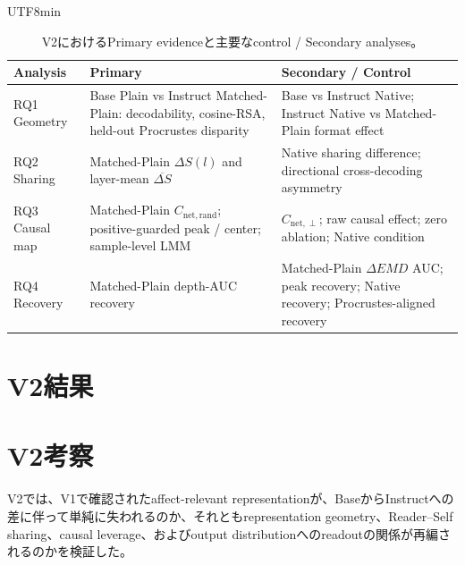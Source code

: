 \documentclass{article} %
\begin{document}
\begin{CJK*}{UTF8}{min}
\begin{table}[htbp]
\centering
\small
\caption{V2におけるPrimary evidenceと主要なcontrol / Secondary analyses。}
\label{tab:v2-primary-secondary}
\begin{tabularx}{\linewidth}{
@{}
>{\raggedright\arraybackslash}p{2.1cm}
>{\raggedright\arraybackslash}p{4.1cm}
>{\raggedright\arraybackslash}X
@{}
}
\toprule
\textbf{Analysis} &
\textbf{Primary} &
\textbf{Secondary / Control} \\
\midrule
RQ1 Geometry &
Base Plain vs Instruct Matched-Plain:
decodability,
cosine-RSA,
held-out Procrustes disparity &
Base vs Instruct Native;
Instruct Native vs Matched-Plain format effect \\

RQ2 Sharing &
Matched-Plain
\(\Delta S(l)\) and layer-mean
\(\overline{\Delta S}\) &
Native sharing difference;
directional cross-decoding asymmetry \\

RQ3 Causal map &
Matched-Plain
\(C_{\mathrm{net,rand}}\);
positive-guarded peak / center;
sample-level LMM &
\(C_{\mathrm{net,\perp}}\);
raw causal effect;
zero ablation;
Native condition \\

RQ4 Recovery &
Matched-Plain
depth-AUC recovery &
Matched-Plain \(\Delta EMD\) AUC;
peak recovery;
Native recovery;
Procrustes-aligned recovery \\
\bottomrule
\end{tabularx}
\end{table}



\section{V2結果}
\label{sec:v2-results}




\section{V2考察}
\label{sec:v2-discussion}

V2では、V1で確認されたaffect-relevant representationが、BaseからInstructへの差に伴って単純に失われるのか、それともrepresentation geometry、Reader--Self sharing、causal leverage、およびoutput distributionへのreadoutの関係が再編されるのかを検証した。


\end{CJK*}
\end{document}
